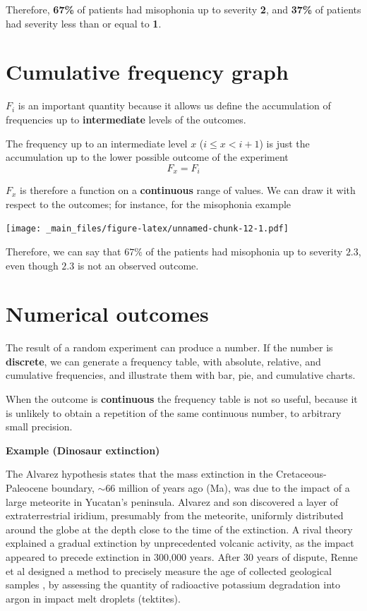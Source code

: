 \documentclass[
]{book}
\begin{document}
Therefore, \textbf{67\%} of patients had misophonia up to severity \textbf{2}, and \textbf{37\%} of patients had severity less than or equal to \textbf{1}.

\hypertarget{cumulative-frequency-graph}{%
\section{Cumulative frequency graph}\label{cumulative-frequency-graph}}

\(F_i\) is an important quantity because it allows us define the accumulation of frequencies up to \textbf{intermediate} levels of the outcomes.

The frequency up to an intermediate level \(x\) (\(i\leq x< i+1\)) is just the accumulation up to the lower possible outcome of the experiment \[F_x = F_i\]

\(F_x\) is therefore a function on a \textbf{continuous} range of values. We can draw it with respect to the outcomes; for instance, for the misophonia example

\texttt{[image: \_main\_files/figure-latex/unnamed-chunk-12-1.pdf]}

Therefore, we can say that \textbf{\(67\%\)} of the patients had misophonia up to severity \(2.3\), even though \(2.3\) is not an observed outcome.

\hypertarget{numerical-outcomes}{%
\section{Numerical outcomes}\label{numerical-outcomes}}

The result of a random experiment can produce a number. If the number is \textbf{discrete}, we can generate a frequency table, with absolute, relative, and cumulative frequencies, and illustrate them with bar, pie, and cumulative charts.

When the outcome is \textbf{continuous} the frequency table is not so useful, because it is unlikely to obtain a repetition of the same continuous number, to arbitrary small precision.

\textbf{Example (Dinosaur extinction)}

The Alvarez hypothesis states that the mass extinction in the Cretaceous-Paleocene boundary, \(\sim 66\) million of years ago (Ma), was due to the impact of a large meteorite in Yucatan's peninsula. Alvarez and son discovered a layer of extraterrestrial iridium, presumably from the meteorite, uniformly distributed around the globe at the depth close to the time of the extinction. A rival theory explained a gradual extinction by unprecedented volcanic activity, as the impact appeared to precede extinction in 300,000 years. After 30 years of dispute, Renne et al designed a method to precisely measure the age of collected geological samples \citep{Renne2013}, by assessing the quantity of radioactive potassium degradation into argon in impact melt droplets (tektites).
\end{document}
